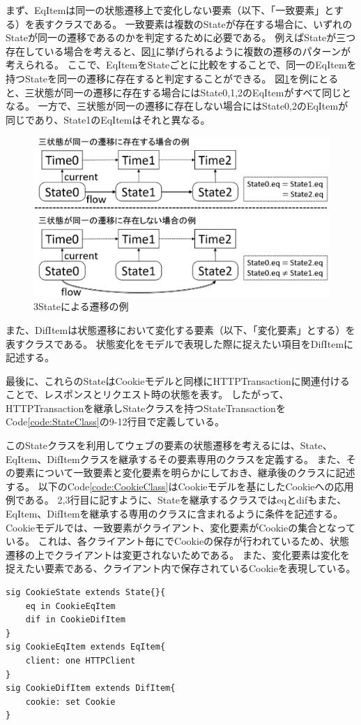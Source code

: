 \documentclass[12pt,a4paper]{jbook}
\begin{document}
まず、EqItemは同一の状態遷移上で変化しない要素（以下、「一致要素」とする）を表すクラスである。
一致要素は複数のStateが存在する場合に、いずれのStateが同一の遷移であるのかを判定するために必要である。
例えばStateが三つ存在している場合を考えると、図\ref{fig:ProposedModel-3StateFlow}に挙げられるように複数の遷移のパターンが考えられる。
ここで、EqItemをStateごとに比較をすることで、同一のEqItemを持つStateを同一の遷移に存在すると判定することができる。
図\ref{fig:ProposedModel-3StateFlow}を例にとると、三状態が同一の遷移に存在する場合にはState0,1,2のEqItemがすべて同じとなる。
一方で、三状態が同一の遷移に存在しない場合にはState0,2のEqItemが同じであり、State1のEqItemはそれと異なる。

\begin{figure}[htb]
\centering
\includegraphics[width=400pt]{./fig/ProposedModel-3StateFlow.eps}
\caption{3Stateによる遷移の例}
\label{fig:ProposedModel-3StateFlow}
\end{figure}

また、DifItemは状態遷移において変化する要素（以下、「変化要素」とする）を表すクラスである。
状態変化をモデルで表現した際に捉えたい項目をDifItemに記述する。

最後に、これらのStateはCookieモデルと同様にHTTPTransactionに関連付けることで、レスポンスとリクエスト時の状態を表す。
したがって、HTTPTransactionを継承しStateクラスを持つStateTransactionをCode\ref{code:StateClass}の9-12行目で定義している。

このStateクラスを利用してウェブの要素の状態遷移を考えるには、State、EqItem、DifItemクラスを継承するその要素専用のクラスを定義する。
また、その要素について一致要素と変化要素を明らかにしておき、継承後のクラスに記述する。
以下のCode\ref{code:CookieClass}はCookieモデルを基にしたCookieへの応用例である。
2,3行目に記すように、Stateを継承するクラスではeqとdifもまた、EqItem、DifItemを継承する専用のクラスに含まれるように条件を記述する。
Cookieモデルでは、一致要素がクライアント、変化要素がCookieの集合となっている。
これは、各クライアント毎にでCookieの保存が行われているため、状態遷移の上でクライアントは変更されないためである。
また、変化要素は変化を捉えたい要素である、クライアント内で保存されているCookieを表現している。
\begin{lstlisting}[caption=Cookieへの応用例, label=code:CookieClass]
sig CookieState extends State{}{
	eq in CookieEqItem
	dif in CookieDifItem
}
sig CookieEqItem extends EqItem{
	client: one HTTPClient
}
sig CookieDifItem extends DifItem{
	cookie: set Cookie
}
\end{lstlisting}
\end{document}
